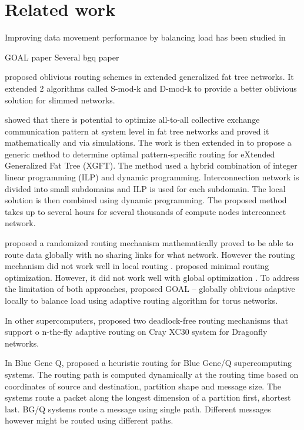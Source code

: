\section{Related work}
\label{sec:relatedwork}

Improving data movement performance by balancing load has been studied in 

GOAL paper \cite{singh2003:GOAL}
Several bgq paper

\cite{Rodriguez09} proposed oblivious routing schemes in extended generalized fat tree networks. It extended 2 algorithms called S-mod-k and D-mod-k to provide a better oblivious solution for slimmed networks. 

\cite{Prisacari13a} showed that there is potential to optimize all-to-all collective exchange communication pattern at system level in fat tree networks and proved it mathematically and via simulations. The work is then extended in \cite{Prisacari13b} to propose a generic method to determine optimal pattern-specific routing for eXtended Generalized Fat Tree (XGFT). The method used a hybrid combination of integer linear programming (ILP) and dynamic programming. Interconnection network is divided into small subdomains and ILP is used for each subdomain. The local solution is then combined using dynamic programming. The proposed method takes up to several hours for several thousands of compute nodes interconnect network.

\cite{Valiant81:Routing} proposed a randomized routing mechanism mathematically proved to be able to route data globally with no sharing links for what network. However the routing mechanism did not work well in local routing \cite{singh2003:GOAL} . \cite{Pifarre91} proposed minimal routing optimization. However, it did not work well with global optimization \cite{singh2003:GOAL} . To address the limitation of both approaches, \cite{singh2003:GOAL} proposed GOAL – globally oblivious adaptive locally to balance load using adaptive routing algorithm for torus networks. 

In other supercomputers, \cite{garcia2013:CrayDragonfly} proposed two deadlock-free routing mechanisms that support o
n-the-fly adaptive routing on Cray XC30 system for Dragonfly networks.

In Blue Gene Q, \cite{Chen:BGQ} proposed a heuristic routing for Blue Gene/Q supercomputing systems. The routing path is computed dynamically at the routing time based on coordinates of source and destination, partition shape and message size. The systems route a packet along the longest dimension of a partition first, shortest last. BG/Q systems route a message using single path. Different messages however might be routed using different paths.

